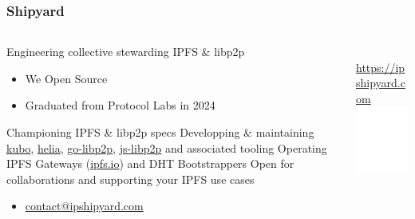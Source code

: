 \documentclass{../shipyard-slide}
\begin{document}
\begin{frame}
  \frametitle{Shipyard}
  \begin{columns}
    \begin{column}{.8\textwidth}
  \begin{itemize}
    \itemc Engineering collective stewarding IPFS \& libp2p
    \begin{itemize}
      \item[\greencube] We  Open Source
      \item[\greencube] Graduated from Protocol Labs in 2024
    \end{itemize}
    \itemc Championing IPFS \& libp2p specs
    \itemc Developping \& maintaining \href{https://github.com/ipfs/kubo}{kubo}, \href{https://github.com/ipfs/helia}{helia}, \href{https://github.com/libp2p/go-libp2p}{go-libp2p}, \href{https://github.com/libp2p/js-libp2p}{js-libp2p} and associated tooling
    \itemc Operating IPFS Gateways (\href{https://ipfs.io}{ipfs.io}) and DHT Bootstrappers
    \itemc Open for collaborations and supporting your IPFS use cases
    \begin{itemize}
      \item[\greencube] \href{mailto:contact@ipshipyard.com}{contact@ipshipyard.com}
    \end{itemize}
  \end{itemize}
  \end{column}
  \begin{column}{.18\textwidth}
    \begin{center}
    \\
    \smallskip
    {\tiny \href{https://ipshipyard.com}{https://ipshipyard.com}}\\
    \bigskip
    \includegraphics[width=.7\textwidth]{../shipyard-resources/shipyard-vertical-white-trans-bg.png}
    \end{center}
  \end{column}
  \end{columns}
  \end{frame}
\end{document}
